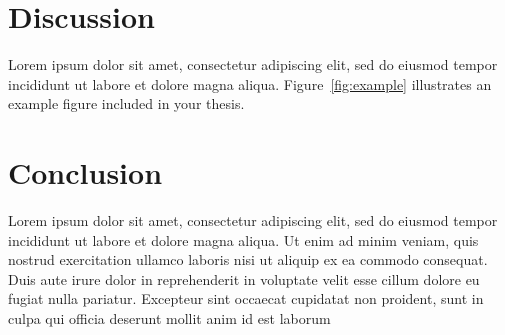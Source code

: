 \documentclass[conference]{IEEEtran}
\begin{document}
	\section{Discussion}
	Lorem ipsum dolor sit amet, consectetur adipiscing elit, sed do eiusmod tempor incididunt ut labore et dolore magna aliqua. 
		Figure~\ref{fig:example} illustrates an example figure included in your thesis.
		
	\section{Conclusion}
	Lorem ipsum dolor sit amet, consectetur adipiscing elit, sed do eiusmod tempor incididunt ut labore et dolore magna aliqua. Ut enim ad minim veniam, quis nostrud exercitation ullamco laboris nisi ut aliquip ex ea commodo consequat. Duis aute irure dolor in reprehenderit in voluptate velit esse cillum dolore eu fugiat nulla pariatur. Excepteur sint occaecat cupidatat non proident, sunt in culpa qui officia deserunt mollit anim id est laborum
	
	
	
	
	
\end{document}
